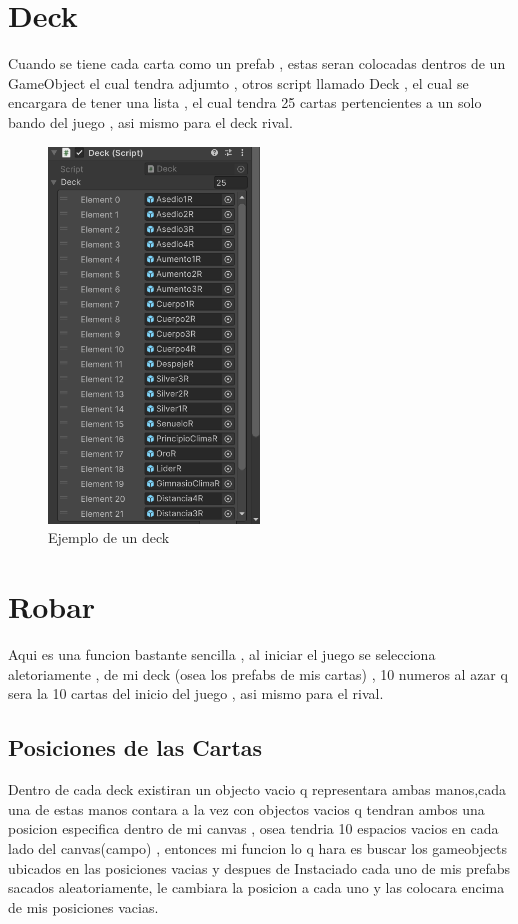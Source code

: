 \documentclass{article}
\begin{document}
\section{Deck}
Cuando se tiene cada carta como un prefab , estas seran colocadas dentros de un GameObject el cual tendra adjumto , otros script llamado Deck , el cual se encargara de tener una lista , el cual tendra 25 cartas pertencientes a un solo bando del juego , asi mismo para el deck rival. 
\begin{figure}
\centering
\includegraphics[width =0.5\textwidth]
{5}
\caption{Ejemplo de un deck}
\label{fig : a}
\end{figure}
\newpage
\section{Robar}
Aqui es una funcion bastante sencilla , al iniciar el juego se selecciona aletoriamente , de mi deck (osea los prefabs de mis cartas) , 10 numeros al azar q sera la 10 cartas del inicio del juego , asi mismo para el rival.
\subsection{Posiciones de las Cartas}
Dentro de cada deck existiran  un objecto vacio q representara ambas manos,cada una de estas manos contara a la vez con objectos vacios q tendran ambos una posicion especifica dentro de mi canvas , osea tendria 10 espacios vacios en cada lado del canvas(campo) , entonces mi funcion lo q hara es buscar los gameobjects ubicados en las posiciones vacias y despues de Instaciado cada uno de mis prefabs sacados aleatoriamente, le cambiara la posicion a cada uno y las colocara encima de mis posiciones vacias.
\end{document}
